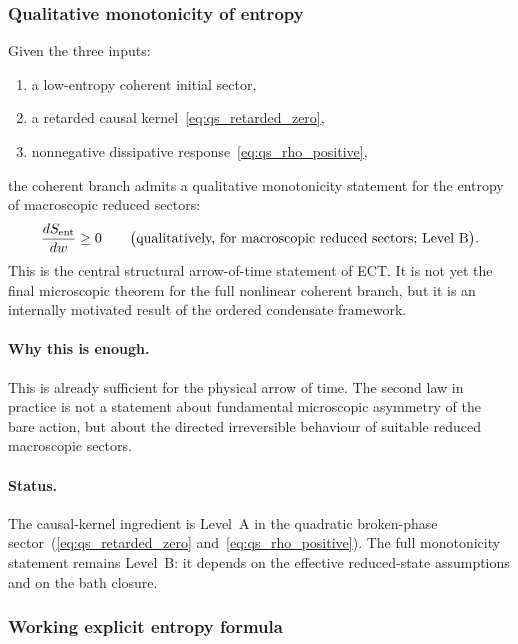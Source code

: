 \subsubsection*{Qualitative monotonicity of entropy}

Given the three inputs:
\begin{enumerate}[label=(\roman*)]
  \item a low-entropy coherent initial sector,
  \item a retarded causal kernel~\eqref{eq:qs_retarded_zero},
  \item nonnegative dissipative response~\eqref{eq:qs_rho_positive},
\end{enumerate}
the coherent branch admits a qualitative monotonicity statement for the
entropy of macroscopic reduced sectors:
\begin{equation}
  \label{eq:qs_entropy_monotone}
  \frac{dS_{\rm ent}}{dw} \ge 0
  \qquad
  \bigl(\text{qualitatively, for macroscopic reduced sectors;
  Level~B}\bigr).
\end{equation}
This is the central structural arrow-of-time statement of ECT.
It is not yet the final microscopic theorem for the full nonlinear
coherent branch, but it is an internally motivated result of the
ordered condensate framework.

\paragraph{Why this is enough.}
This is already sufficient for the physical arrow of time.
The second law in practice is not a statement about fundamental
microscopic asymmetry of the bare action, but about the directed
irreversible behaviour of suitable reduced macroscopic sectors.

\paragraph{Status.}
The causal-kernel ingredient is Level~A in the quadratic broken-phase
sector~(\eqref{eq:qs_retarded_zero} and~\eqref{eq:qs_rho_positive}).
The full monotonicity statement remains Level~B: it depends on the
effective reduced-state assumptions and on the bath closure.

\subsubsection*{Working explicit entropy formula}

